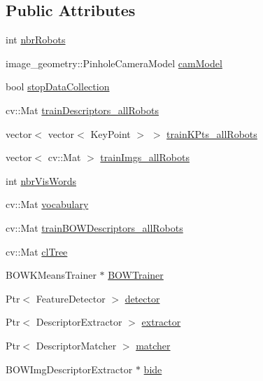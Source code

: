 \subsection*{\-Public \-Attributes}
\begin{DoxyCompactItemize}
\item 
int \hyperlink{classCentralStorage_a83a67f52de30d339d872138243d42764}{nbr\-Robots}
\item 
image\-\_\-geometry\-::\-Pinhole\-Camera\-Model \hyperlink{classCentralStorage_adfcd7e35336daa5d959f783c9180460f}{cam\-Model}
\item 
bool \hyperlink{classCentralStorage_ac721895aafa60a4fb37c9659aabaed7a}{stop\-Data\-Collection}
\item 
cv\-::\-Mat \hyperlink{classCentralStorage_ad574732df5058d95d650c1187a9ba4f6}{train\-Descriptors\-\_\-all\-Robots}
\item 
vector$<$ vector$<$ \-Key\-Point $>$ $>$ \hyperlink{classCentralStorage_a6eba28072f558f36c2b3a08170f9db74}{train\-K\-Pts\-\_\-all\-Robots}
\item 
vector$<$ cv\-::\-Mat $>$ \hyperlink{classCentralStorage_a673208fa43bab02c4e53077ae45a38e7}{train\-Imgs\-\_\-all\-Robots}
\item 
int \hyperlink{classCentralStorage_a6830253bfbd8a4c03cc317820358d25a}{nbr\-Vis\-Words}
\item 
cv\-::\-Mat \hyperlink{classCentralStorage_a50f04d43d8c1f26725bb2e2e560a494c}{vocabulary}
\item 
cv\-::\-Mat \hyperlink{classCentralStorage_ad22679ec76d8fc9c99226a1bfdd4c410}{train\-B\-O\-W\-Descriptors\-\_\-all\-Robots}
\item 
cv\-::\-Mat \hyperlink{classCentralStorage_a5d9e98c4102f50187f6a034a99ef9793}{cl\-Tree}
\item 
\-B\-O\-W\-K\-Means\-Trainer $\ast$ \hyperlink{classCentralStorage_aa30a8d753544480abd495023cbf62a2f}{\-B\-O\-W\-Trainer}
\item 
\-Ptr$<$ \-Feature\-Detector $>$ \hyperlink{classCentralStorage_a3853e38f8eadbe09da6a1855b29704f7}{detector}
\item 
\-Ptr$<$ \-Descriptor\-Extractor $>$ \hyperlink{classCentralStorage_a8c18048b9cf9171a16d6d9e2fa8f8754}{extractor}
\item 
\-Ptr$<$ \-Descriptor\-Matcher $>$ \hyperlink{classCentralStorage_a8ff5fb67a41c196b5677015e09ff33be}{matcher}
\item 
\-B\-O\-W\-Img\-Descriptor\-Extractor $\ast$ \hyperlink{classCentralStorage_ab1828f1368902fab93265328a6e53063}{bide}

\end{DoxyCompactItemize}

